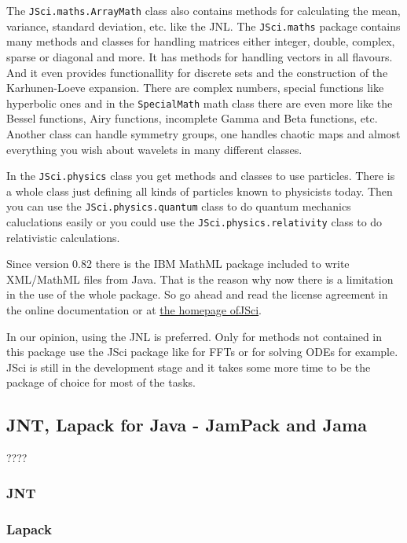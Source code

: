 The \verb|JSci.maths.ArrayMath| class also contains methods for
calculating the mean, variance, standard deviation, etc. like
the JNL. The \verb|JSci.maths| package  
contains many methods and classes for handling matrices
either integer, double, complex, sparse or diagonal and more. It has methods
for handling vectors in all flavours. And it even provides functionallity
for discrete sets and the construction of the Karhunen-Loeve expansion. 
There are complex numbers, special functions like hyperbolic ones
and in the \verb|SpecialMath| math class there are even more like
the Bessel functions, Airy functions, incomplete Gamma and Beta functions, etc.
Another class can handle symmetry groups, one handles chaotic maps and
almost everything you wish about wavelets in many different classes.

In the \verb|JSci.physics| class you get methods and classes to use
particles. There is a whole class just defining all kinds of particles
known to physicists today. Then you can use the \verb|JSci.physics.quantum|
class to do quantum mechanics caluclations easily or you could use
the \verb|JSci.physics.relativity| class to do relativistic calculations.

Since version 0.82 there is the IBM MathML package included to write 
XML/MathML files from Java. That is the reason why now there is a
limitation in the use of the whole package. So go ahead and read the license
agreement in the online documentation or at 
\href{http://http://fourier.dur.ac.uk:8000/~dma3mjh/jsci/index.html}%
{the homepage ofJSci}.

In our opinion, using the JNL is preferred. Only for
methods not contained in this package use the
JSci package like for FFTs or for solving ODEs for example. 
JSci is still in
the development stage and it takes some more time to be 
the package of choice for most of the tasks.   

\subsection{JNT, Lapack for Java - JamPack and Jama}
????
\subsubsection{JNT}
\subsubsection{Lapack}


